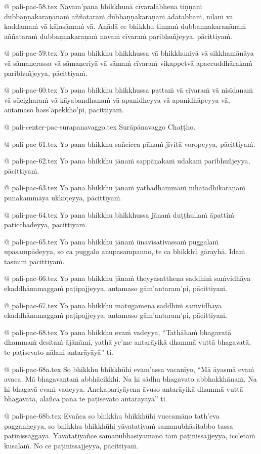 @ pali-pac-58.tex
Navam’pana bhikkhunā cīvaralābhena tiṇṇaṁ dubbaṇṇakaraṇānaṁ aññataraṁ dubbaṇṇakaraṇaṁ ādātabbaṁ, nīlaṁ vā kaddamaṁ vā kāḷasāmaṁ vā. Anādā ce bhikkhu tiṇṇaṁ dubbaṇṇakaraṇānaṁ aññataraṁ dubbaṇṇakaraṇaṁ navaṁ cīvaraṁ paribhuñjeyya, pācittiyaṁ.

@ pali-pac-59.tex
Yo pana bhikkhu bhikkhussa vā bhikkhuniyā vā sikkhamānāya vā sāmaṇerassa vā sāmaṇeriyā vā sāmaṁ cīvaraṁ vikappetvā apaccuddhārakaṁ paribhuñjeyya, pācittiyaṁ.

@ pali-pac-60.tex
Yo pana bhikkhu bhikkhussa pattaṁ vā cīvaraṁ vā nisīdanaṁ vā sūcigharaṁ vā kāyabandhanaṁ vā apanidheyya vā apanidhāpeyya vā, antamaso hass’āpekkho’pi, pācittiyaṁ.

@ pali-center-pac-surapanavaggo.tex
Surāpānavaggo Chaṭṭho.

@ pali-pac-61.tex
Yo pana bhikkhu sañcicca pāṇaṁ jīvitā voropeyya, pācittiyaṁ.

@ pali-pac-62.tex
Yo pana bhikkhu jānaṁ sappāṇakaṁ udakaṁ paribhuñjeyya,
pācittiyaṁ.

@ pali-pac-63.tex
Yo pana bhikkhu jānaṁ yathādhammaṁ nīhatādhikaraṇaṁ punakammāya ukkoṭeyya, pācittiyaṁ.

@ pali-pac-64.tex
Yo pana bhikkhu bhikkhussa jānaṁ duṭṭhullaṁ āpattiṁ paṭicchādeyya, pācittiyaṁ.

@ pali-pac-65.tex
Yo pana bhikkhu jānaṁ ūnavīsativassaṁ puggalaṁ upasampādeyya, so ca puggalo anupasampanno, te ca bhikkhū gārayhā. Idaṁ tasmiṁ pācittiyaṁ.

@ pali-pac-66.tex
Yo pana bhikkhu jānaṁ theyyasatthena saddhiṁ saṁvidhāya ekaddhānamaggaṁ paṭipajjeyya, antamaso gām’antaram’pi, pācittiyaṁ.

@ pali-pac-67.tex
Yo pana bhikkhu mātugāmena saddhiṁ saṁvidhāya ekaddhānamaggaṁ paṭipajjeyya, antamaso gām’antaram’pi, pācittiyaṁ.

@ pali-pac-68.tex
Yo pana bhikkhu evaṁ vadeyya, “Tathāhaṁ bhagavatā dhammaṁ desitaṁ ājānāmi, yathā ye’me antarāyikā dhammā vuttā bhagavatā, te paṭisevato nālaṁ antarāyāyā” ti. 

@ pali-pac-68a.tex
So bhikkhu bhikkhūhi evam’assa vacanīyo, “Mā āyasmā evaṁ avaca. Mā bhagavantaṁ abbhācikkhi. Na hi sādhu bhagavato abbhakkhānaṁ. Na hi bhagavā evaṁ vadeyya. Anekapariyāyena āvuso antarāyikā dhammā vuttā bhagavatā, alañca pana te paṭisevato antarāyāyā” ti. 

@ pali-pac-68b.tex
Evañca so bhikkhu bhikkhūhi vuccamāno tath’eva paggaṇheyya, so bhikkhu bhikkhūhi yāvatatiyaṁ samanubhāsitabbo tassa paṭinissaggāya. Yāvatatiyañce samanubhāsiyamāno taṁ paṭinissajjeyya, icc’etaṁ kusalaṁ. No ce paṭinissajjeyya, pācittiyaṁ.

